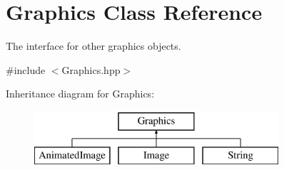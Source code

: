 \hypertarget{class_graphics}{}\section{Graphics Class Reference}
\label{class_graphics}


The interface for other graphics objects.  




{\ttfamily \#include $<$Graphics.\+hpp$>$}

Inheritance diagram for Graphics\+:\begin{figure}[H]
\begin{center}
\leavevmode
\includegraphics[height=2.000000cm]{class_graphics}
\end{center}
\end{figure}
